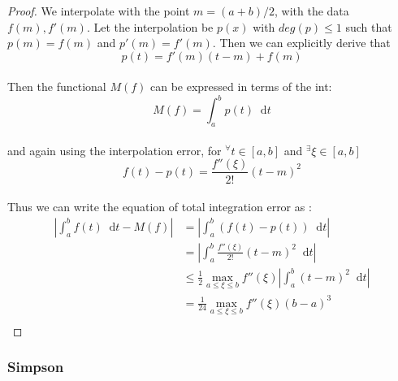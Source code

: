 \documentclass[paper=a4, fontsize=11pt]{scrartcl}
\newcommand*\dif{\mathop{}\!\mathrm{d}}
\begin{document}
\begin{proof}
	We interpolate with the point $m=(a+b)/2$, with the data $f(m),f'(m)$. Let the interpolation be $p(x)$ with $deg(p)\leq 1$ such that $p(m)=f(m)$ and $p'(m)=f'(m)$. Then we can explicitly derive that \\
	
	\begin{equation}\nonumber
		p(t)= f'(m)(t-m) + f(m)
	\end{equation}\\
	
	Then the functional $M(f)$ can be expressed in terms of the int: \\
	
	\begin{equation}\nonumber
		M(f) = \int_{a}^{b} p(t) \dif t
	\end{equation}\\
	
	and again using the interpolation error, for $^\forall t \in [a,b]$ and $^\exists \xi \in [a,b]$ \\
	
	\begin{equation}\nonumber
		f(t)-p(t) =  \frac{f''(\xi)}{2!}(t-m)^2
	\end{equation}\\
	
	Thus we can write the equation of total integration error as :\\
	
	\begin{equation}\nonumber
		\begin{split}
		\left| \int_{a}^{b} f(t) \dif t - M(f) \right| &= \left| \int_{a}^{b} (f(t) - p(t))  \dif t \right| \\[2.5ex]
		&= \left| \int_{a}^{b} \frac{f''(\xi)}{2!}(t-m)^2 \dif t \right| \\[2.5ex]
		&\leq \frac{1}{2} \max_{a\leq\xi\leq b}f''(\xi) \left| \int_{a}^{b} (t-m)^2 \dif t \right| \\[2.5ex]
		&= \frac{1}{24} \max_{a\leq\xi\leq b}f''(\xi) (b-a)^3 \\
		\end{split}
	\end{equation}
\end{proof}

\vspace{0.15in}
\subsubsection{Simpson}
\vspace{0.15in}
\end{document}
